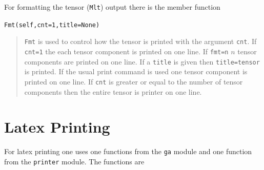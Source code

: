 \documentclass[12pt,twoside,openright]{memoir}
\newcommand{\T}[1]{\texttt{#1}}
\begin{document}
For formatting the tensor (\T{Mlt}) output there is the member function

\T{Fmt(self,cnt=1,title=None)}
\begin{quote}
\T{Fmt} is used to control how the tensor is printed with the argument
\T{cnt}.  If \T{cnt=1} the each tensor component is printed on one line.  If
\T{fmt=n} $n$ tensor components are printed on one line.  If a
\T{title} is given then \T{title=tensor} is printed.  If the usual print
command is used one tensor component is printed on one line. If \T{cnt} is
greater or equal to the number of tensor components then the entire tensor
is printer on one line.
\end{quote}

\section{Latex Printing}\label{LatexPrinting}

For latex printing one uses one functions from the \T{ga} module and one
function from the \T{printer} module.  The
functions are
\end{document}
